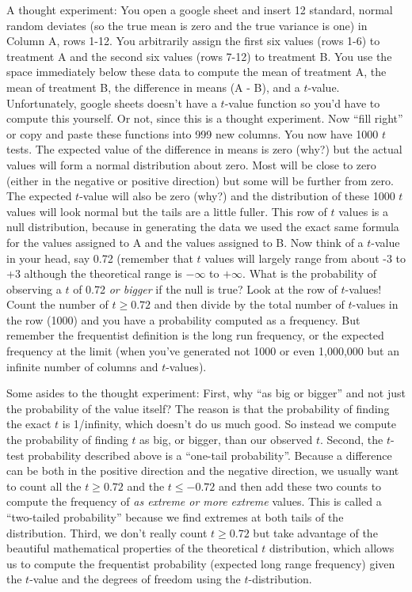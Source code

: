 \documentclass[]{book}
\begin{document}
A thought experiment: You open a google sheet and insert 12 standard,
normal random deviates (so the true mean is zero and the true variance
is one) in Column A, rows 1-12. You arbitrarily assign the first six
values (rows 1-6) to treatment A and the second six values (rows 7-12)
to treatment B. You use the space immediately below these data to
compute the mean of treatment A, the mean of treatment B, the difference
in means (A - B), and a \(t\)-value. Unfortunately, google sheets
doesn't have a \(t\)-value function so you'd have to compute this
yourself. Or not, since this is a thought experiment. Now ``fill right''
or copy and paste these functions into 999 new columns. You now have
1000 \(t\) tests. The expected value of the difference in means is zero
(why?) but the actual values will form a normal distribution about zero.
Most will be close to zero (either in the negative or positive
direction) but some will be further from zero. The expected \(t\)-value
will also be zero (why?) and the distribution of these 1000 \(t\) values
will look normal but the tails are a little fuller. This row of \(t\)
values is a null distribution, because in generating the data we used
the exact same formula for the values assigned to A and the values
assigned to B. Now think of a \(t\)-value in your head, say 0.72
(remember that \(t\) values will largely range from about -3 to +3
although the theoretical range is \(-\infty\) to \(+\infty\). What is
the probability of observing a \(t\) of 0.72 \emph{or bigger} if the
null is true? Look at the row of \(t\)-values! Count the number of
\(t \ge 0.72\) and then divide by the total number of \(t\)-values in
the row (1000) and you have a probability computed as a frequency. But
remember the frequentist definition is the long run frequency, or the
expected frequency at the limit (when you've generated not 1000 or even
1,000,000 but an infinite number of columns and \(t\)-values).

Some asides to the thought experiment: First, why ``as big or bigger''
and not just the probability of the value itself? The reason is that the
probability of finding the exact \(t\) is 1/infinity, which doesn't do
us much good. So instead we compute the probability of finding \(t\) as
big, or bigger, than our observed \(t\). Second, the \(t\)-test
probability described above is a ``one-tail probability''. Because a
difference can be both in the positive direction and the negative
direction, we usually want to count all the \(t \ge 0.72\) and the
\(t \le -0.72\) and then add these two counts to compute the frequency
of \emph{as extreme or more extreme} values. This is called a
``two-tailed probability'' because we find extremes at both tails of the
distribution. Third, we don't really count \(t \ge 0.72\) but take
advantage of the beautiful mathematical properties of the theoretical
\(t\) distribution, which allows us to compute the frequentist
probability (expected long range frequency) given the \(t\)-value and
the degrees of freedom using the \(t\)-distribution.
\end{document}

